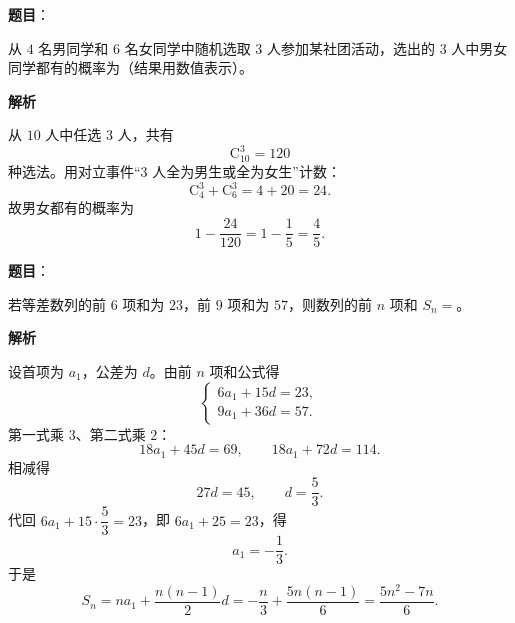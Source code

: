 \begin{answer}

\textbf{题目}：

从 $4$ 名男同学和 $6$ 名女同学中随机选取 $3$ 人参加某社团活动，选出的 $3$ 人中男女同学都有的概率为\gkblank{}（结果用数值表示）。

\textbf{解析}

从 $10$ 人中任选 $3$ 人，共有
\nopagebreak[4]
\[\mathrm C_{10}^3=120\]
种选法。用对立事件“$3$ 人全为男生或全为女生”计数：
\nopagebreak[4]
\[\mathrm C_4^3+\mathrm C_6^3=4+20=24.\]
故男女都有的概率为
\nopagebreak[4]
\[1-\frac{24}{120}=1-\frac15=\frac45.\]


\end{answer}
\begin{answer}

\textbf{题目}：

若等差数列的前 $6$ 项和为 $23$，前 $9$ 项和为 $57$，则数列的前 $n$ 项和 $S_n=$\gkblank{}。

\textbf{解析}

设首项为 $a_1$，公差为 $d$。由前 $n$ 项和公式得
\nopagebreak[4]
\[\begin{cases}6a_1+15d=23,\\ 9a_1+36d=57.\end{cases}\]
第一式乘 $3$、第二式乘 $2$：
\nopagebreak[4]
\[18a_1+45d=69,\qquad 18a_1+72d=114.\]
相减得
\nopagebreak[4]
\[27d=45,\qquad d=\frac53.\]
代回 $6a_1+15\cdot\dfrac53=23$，即 $6a_1+25=23$，得
\nopagebreak[4]
\[a_1=-\frac13.\]
于是
\nopagebreak[4]
\[S_n=na_1+\frac{n(n-1)}2d
=-\frac n3+\frac{5n(n-1)}6
=\frac{5n^2-7n}{6}.\]


\end{answer}
